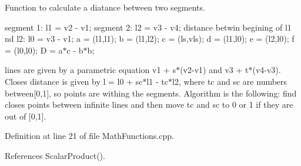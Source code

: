 Function to calculate a diatance between two segments. 

segment 1\+: l1 = v2 -\/ v1; segment 2\+: l2 = v3 -\/ v4; distance betwin begining of l1 nd l2\+: l0 = v3 -\/ v1; a = (l1,l1); b = (l1,l2); c = (ls,vls); d = (l1,l0); e = (l2,l0); f = (l0,l0); D = a$\ast$c -\/ b$\ast$b;

lines are given by a parametric equation v1 + s$\ast$(v2-\/v1) and v3 + t$\ast$(v4-\/v3). Closes distance is given by l = l0 + sc$\ast$l1 -\/ tc$\ast$l2, where tc and sc are numbers between\mbox{[}0,1\mbox{]}, so points are withing the segments. Algorithm is the following\+: find closes points between infinite lines and then move tc and sc to 0 or 1 if they are out of \mbox{[}0,1\mbox{]}.

Definition at line 21 of file Math\+Functions.\+cpp.



References Scalar\+Product().

